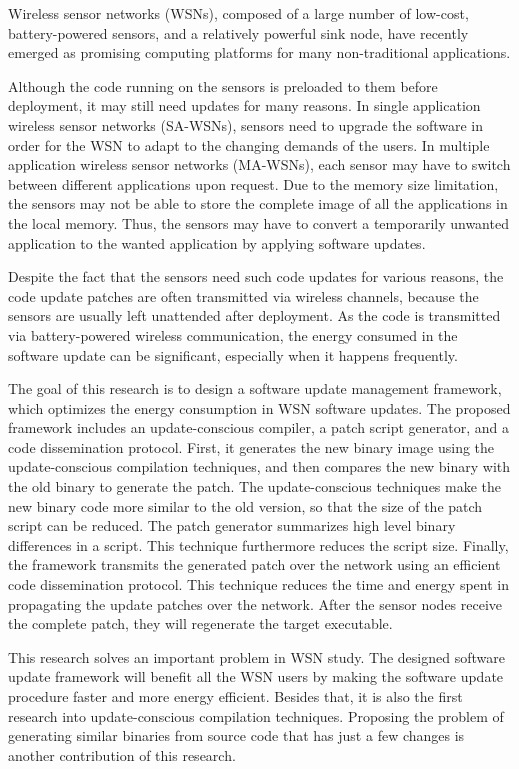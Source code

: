 Wireless sensor networks (WSNs), composed of a large number of low-cost, battery-powered sensors, and a relatively 
powerful sink node, have recently emerged as promising computing platforms for many non-traditional applications. 

Although the code running on the sensors is preloaded to them before deployment, it may still need updates for many 
reasons. 
In single application wireless sensor networks (SA-WSNs), sensors need to upgrade the software in order for the WSN to 
adapt to the changing demands of the users.
In multiple application wireless sensor networks (MA-WSNs), each sensor may have to switch between different 
applications upon request. Due to the memory size limitation, the sensors may not be able to store the complete image 
of all the applications in the local memory. 
Thus, the sensors may have to convert a temporarily unwanted application to the wanted application by applying software 
updates.

Despite the fact that the sensors need such code updates for various reasons, the code update patches are often 
transmitted via wireless channels, because the sensors are usually left unattended after deployment. As the code is 
transmitted via battery-powered wireless communication, the energy consumed in the software update can be significant, 
especially when it happens frequently.

The goal of this research is to design a software update management framework, which
optimizes the energy consumption in WSN software updates. The proposed framework
includes an update-conscious compiler, a patch script generator, and a code dissemination
protocol. First, it generates the new binary image using the update-conscious compilation
techniques, and then compares the new binary with the old binary to generate the patch.
The update-conscious techniques make the new binary code more similar to the old version,
so that the size of the patch script can be reduced. The patch generator summarizes high
level binary differences in a script. This technique furthermore reduces the script size.
Finally, the framework transmits the generated patch over the network using an efficient code
dissemination protocol. This technique reduces the time and energy spent in propagating
the update patches over the network. After the sensor nodes receive the complete patch,
they will regenerate the target executable.

This research solves an important problem in WSN study. The designed software update framework will benefit all the WSN 
users by making the software update procedure faster and more energy efficient. Besides that, it is also the first 
research into update-conscious compilation techniques. Proposing the problem of generating similar binaries from source 
code that has just a few changes is another contribution of this research. 
